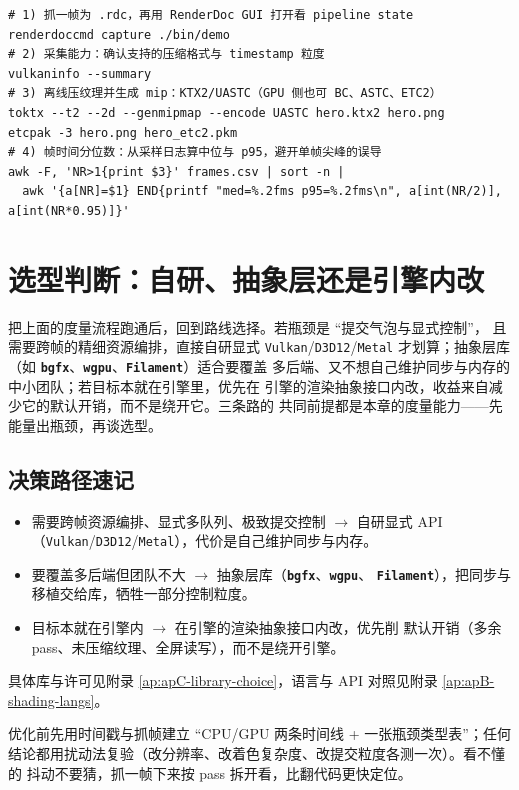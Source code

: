 \documentclass[12pt,a4paper,fontset=fandol]{ctexbook}
\newcommand{\Tp}[1]{\texttt{#1}}
\newcommand{\Bk}{\discretionary{}{}{}}
\newcommand{\Lib}[1]{\textbf{\texttt{#1}}}
\begin{document}
\begin{lstlisting}[style=shellstyle,caption={抓帧、压缩与帧时间统计的命令组合},label={lst:ch14-tools}]
# 1) 抓一帧为 .rdc，再用 RenderDoc GUI 打开看 pipeline state
renderdoccmd capture ./bin/demo
# 2) 采集能力：确认支持的压缩格式与 timestamp 粒度
vulkaninfo --summary
# 3) 离线压纹理并生成 mip：KTX2/UASTC（GPU 侧也可 BC、ASTC、ETC2）
toktx --t2 --2d --genmipmap --encode UASTC hero.ktx2 hero.png
etcpak -3 hero.png hero_etc2.pkm
# 4) 帧时间分位数：从采样日志算中位与 p95，避开单帧尖峰的误导
awk -F, 'NR>1{print $3}' frames.csv | sort -n |
  awk '{a[NR]=$1} END{printf "med=%.2fms p95=%.2fms\n", a[int(NR/2)], a[int(NR*0.95)]}'
\end{lstlisting}

\section{选型判断：自研、抽象层还是引擎内改}

把上面的度量流程跑通后，回到路线选择。若瓶颈是 ``提交气泡与显式控制''，
且需要跨帧的精细资源编排，直接自研显式 \Tp{Vulkan}/{\Bk}\Tp{D3D12}/{\Bk}\Tp{Metal}
才划算；抽象层库（如 \Lib{bgfx}、\Lib{wgpu}、\Lib{Filament}）适合要覆盖
多后端、又不想自己维护同步与内存的中小团队；若目标本就在引擎里，优先在
引擎的渲染抽象接口内改，收益来自减少它的默认开销，而不是绕开它。三条路的
共同前提都是本章的度量能力——先能量出瓶颈，再谈选型。

\subsection{决策路径速记}

\begin{itemize}
  \item 需要跨帧资源编排、显式多队列、极致提交控制 $\rightarrow$ 自研显式
        API（\Tp{Vulkan}/{\Bk}\Tp{D3D12}/{\Bk}\Tp{Metal}），代价是自己维护同步与内存。
  \item 要覆盖多后端但团队不大 $\rightarrow$ 抽象层库（\Lib{bgfx}、\Lib{wgpu}、
        \Lib{Filament}），把同步与移植交给库，牺牲一部分控制粒度。
  \item 目标本就在引擎内 $\rightarrow$ 在引擎的渲染抽象接口内改，优先削
        默认开销（多余 pass、未压缩纹理、全屏读写），而不是绕开引擎。
\end{itemize}
具体库与许可见附录 \ref{ap:apC-library-choice}，语言与 API 对照见附录
\ref{ap:apB-shading-langs}。

\begin{guideline}[title={测量先于优化，扰动验证结论}]
优化前先用时间戳与抓帧建立 ``CPU/GPU 两条时间线 + 一张瓶颈类型表''；任何
结论都用扰动法复验（改分辨率、改着色复杂度、改提交粒度各测一次）。看不懂的
抖动不要猜，抓一帧下来按 pass 拆开看，比翻代码更快定位。
\end{guideline}
\end{document}
